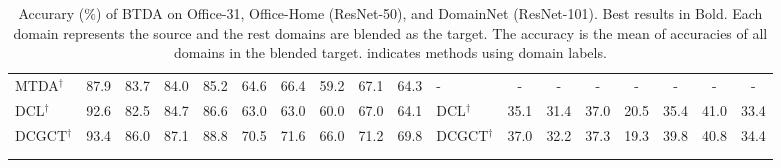 \documentclass[letterpaper]{article} \usepackage{aaai23}  \usepackage{times}  \usepackage{helvet}  \usepackage{courier}  \usepackage[hyphens]{url}  \usepackage{graphicx} \urlstyle{rm} \def\UrlFont{\rm}  \usepackage{natbib}  \usepackage{caption} \frenchspacing  \setlength{\pdfpagewidth}{8.5in}  \setlength{\pdfpageheight}{11in}
\begin{document}
\begin{table*}[t]
{\begin{tabular}{@{}llcccccccccllccccccc@{}}
\multicolumn{2}{l}{MTDA$^{\dag}$}     & 87.9     & 83.7     & 84.0     & \multicolumn{1}{c|}{85.2}    & 64.6      & 66.4    & 59.2    & 67.1     & \multicolumn{1}{c|}{64.3}     & \multicolumn{2}{l}{-}       & -        & -      & -      & -       & -     & -      & -       \\
\multicolumn{2}{l}{DCL$^{\dag}$}    & 92.6    & 82.5    & 84.7  & \multicolumn{1}{c|}{86.6}     & 63.0    & 63.0     & 60.0     & 67.0    & \multicolumn{1}{c|}{64.1}          & \multicolumn{2}{l}{DCL$^{\dag}$}        & 35.1        & 31.4        & 37.0        & 20.5     & 35.4     & 41.0        & 33.4          \\
\multicolumn{2}{l}{DCGCT$^{\dag}$}    & 93.4     & 86.0    & 87.1    & \multicolumn{1}{c|}{88.8}   & 70.5      & 71.6         & 66.0         & 71.2         & \multicolumn{1}{c|}{69.8}          & \multicolumn{2}{l}{DCGCT$^{\dag}$}      & 37.0                 & 32.2                 & 37.3                 & 19.3                 & 39.8                 & 40.8                 & 34.4                 \\ \midrule
                      &                      & \multicolumn{1}{l}{} & \multicolumn{1}{l}{} & \multicolumn{1}{l}{} & \multicolumn{1}{l}{}               & \multicolumn{1}{l}{} & \multicolumn{1}{l}{} & \multicolumn{1}{l}{} & \multicolumn{1}{l}{} & \multicolumn{1}{l}{}               &                       &                      & \multicolumn{1}{l}{} & \multicolumn{1}{l}{} & \multicolumn{1}{l}{} & \multicolumn{1}{l}{} & \multicolumn{1}{l}{} & \multicolumn{1}{l}{} & \multicolumn{1}{l}{} \\
                      &                      & \multicolumn{1}{l}{} & \multicolumn{1}{l}{} & \multicolumn{1}{l}{} & \multicolumn{1}{l}{}               & \multicolumn{1}{l}{} & \multicolumn{1}{l}{} & \multicolumn{1}{l}{} & \multicolumn{1}{l}{} & \multicolumn{1}{l}{}               &                       &                      & \multicolumn{1}{l}{} & \multicolumn{1}{l}{} & \multicolumn{1}{l}{} & \multicolumn{1}{l}{} & \multicolumn{1}{l}{} & \multicolumn{1}{l}{} & \multicolumn{1}{l}{}
\end{tabular}
}
\vspace{-0.8cm}
\caption{Accurary ($\%$) of BTDA on Office-31, Office-Home (ResNet-50), and  DomainNet (ResNet-101). Best results in Bold. Each domain represents the source and the rest domains are blended as the target. The accuracy is the mean of accuracies of all domains in the blended target. \dag indicates methods using domain labels.}
\label{btda_all}
\end{table*}
\end{document}
